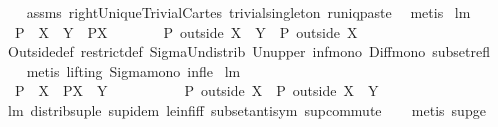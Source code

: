 \begin{isabellebody}
%
\isadelimproof
\ \ %
\endisadelimproof
%
\isatagproof
{}\isamarkupfalse%
\ assms\ rightUniqueTrivialCartes\ trivial{\isacharunderscore}singleton\ runiq{\isacharunderscore}paste{}\ \isamarkupfalse%
\ metis%
\endisatagproof
{\isafoldproof}%
%
\isadelimproof
\isanewline
%
\endisadelimproof
\isanewline
{}\isamarkupfalse%
\ lm{}{}{}{\isacharcolon}\ \isanewline
\ \ {\isachardoublequoteopen}{\isacharparenleft}P\ {\isacharbar}{\isacharbar}\ {\isacharparenleft}X\ {\isasyminter}\ Y{\isacharparenright}{\isacharparenright}\ {\isasymsubseteq}\ {\isacharparenleft}P{\isacharbar}{\isacharbar}X{\isacharparenright}\ \ \ \ {\isacharampersand}\ \ \ \ P\ outside\ {\isacharparenleft}X\ {\isasymunion}\ Y{\isacharparenright}\ {\isasymsubseteq}\ P\ outside\ X{\isachardoublequoteclose}\ \isanewline
%
\isadelimproof
\ \ %
\endisadelimproof
%
\isatagproof
{}\isamarkupfalse%
\ Outside{\isacharunderscore}def\ restrict{\isacharunderscore}def\ Sigma{\isacharunderscore}Un{\isacharunderscore}distrib{}\ Un{\isacharunderscore}upper{}\ inf{\isacharunderscore}mono\ Diff{\isacharunderscore}mono\ subset{\isacharunderscore}refl\ \isanewline
\ \ \isamarkupfalse%
\ {\isacharparenleft}metis\ {\isacharparenleft}lifting{\isacharparenright}\ Sigma{\isacharunderscore}mono\ inf{\isacharunderscore}le{}{\isacharparenright}%
\endisatagproof
{\isafoldproof}%
%
\isadelimproof
\isanewline
%
\endisadelimproof
\isanewline
{}\isamarkupfalse%
\ lm{}{}{}{\isacharcolon}\ \isanewline
\ \ {\isachardoublequoteopen}P\ {\isacharbar}{\isacharbar}\ X\ {\isasymsubseteq}\ {\isacharparenleft}P{\isacharbar}{\isacharbar}{\isacharparenleft}X\ {\isasymunion}\ Y{\isacharparenright}{\isacharparenright}\ \ \ \ \ \ \ {\isacharampersand}\ \ \ \ P\ outside\ X\ {\isasymsubseteq}\ P\ outside\ {\isacharparenleft}X\ {\isasyminter}\ Y{\isacharparenright}{\isachardoublequoteclose}\ \isanewline
%
\isadelimproof
\ \ %
\endisadelimproof
%
\isatagproof
{}\isamarkupfalse%
\ lm{}{}{}\ distrib{\isacharunderscore}sup{\isacharunderscore}le\ sup{\isacharunderscore}idem\ le{\isacharunderscore}inf{\isacharunderscore}iff\ subset{\isacharunderscore}antisym\ sup{\isacharunderscore}commute\isanewline
\ \ \isamarkupfalse%
\ {\isacharparenleft}metis\ sup{\isacharunderscore}ge{}{\isacharparenright}%
\endisatagproof
{\isafoldproof}%
%
\isadelimproof
\isanewline
%
\endisadelimproof

\end{isabellebody}
